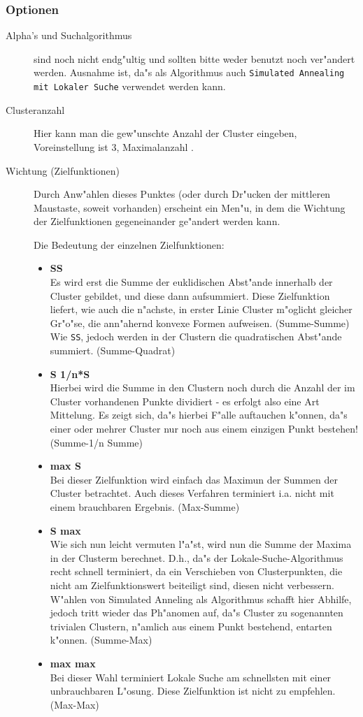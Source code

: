 \subsubsection{Optionen}
\label{Zielfunktionenkapitel}
\begin{description}
\item[Alpha's und Suchalgorithmus] sind noch nicht endg"ultig und sollten
	bitte weder benutzt noch ver"andert werden. Ausnahme ist, da"s als
	Algorithmus auch \verb-Simulated Annealing mit Lokaler Suche-
	verwendet werden kann.
\item[Clusteranzahl] Hier kann man die gew"unschte Anzahl der Cluster
	eingeben, Voreinstellung ist 3, Maximalanzahl \MAXCLUSTER.
\item[Wichtung (Zielfunktionen)] Durch Anw"ahlen dieses Punktes (oder
	durch Dr"ucken der mittleren Maustaste, soweit vorhanden) erscheint
	ein Men"u, in dem die Wichtung der Zielfunktionen gegeneinander
	ge"andert werden kann.

	Die Bedeutung der einzelnen Zielfunktionen:
	\begin{itemize}
	\item {\bf SS}\\
		Es wird erst die Summe der euklidischen Abst"ande innerhalb
		der Cluster gebildet, und diese dann aufsummiert.
		Diese Zielfunktion liefert, wie auch die n"achste, in erster
		Linie Cluster m"oglicht gleicher Gr"o"se, die ann"ahernd
		konvexe Formen aufweisen. (Summe-Summe)
	\\
		Wie \verb-SS-, jedoch werden in der Clustern die 
		quadratischen Abst"ande summiert. (Summe-Quadrat)
	\item {\bf S 1/n*S}\\
		Hierbei wird die Summe in den Clustern noch durch die Anzahl
		der im Cluster vorhandenen Punkte dividiert - es erfolgt
		also eine Art Mittelung. Es zeigt sich, da"s hierbei
		F"alle auftauchen k"onnen, da"s einer oder mehrer Cluster
		nur noch aus einem einzigen Punkt bestehen!
		(Summe-1/n Summe)
	\item {\bf max S}\\
		Bei dieser Zielfunktion wird einfach das Maximun der Summen
		der Cluster betrachtet.  Auch dieses Verfahren terminiert
		i.a. nicht mit einem brauchbaren Ergebnis. (Max-Summe)
	\item {\bf S max}\\
		Wie sich nun leicht vermuten l"a"st, wird nun die Summe
		der Maxima in der Clusterm berechnet. D.h., da"s der
		Lokale-Suche-Algorithmus recht schnell terminiert, da ein
		Verschieben von Clusterpunkten, die nicht am 
		Zielfunktionswert beiteiligt sind, diesen nicht verbessern.
		W"ahlen von Simulated Anneling als Algorithmus schafft
		hier Abhilfe, jedoch tritt wieder das Ph"anomen auf, da"s 
		Cluster zu sogenannten trivialen Clustern, n"amlich aus
		einem Punkt bestehend, entarten k"onnen.
		(Summe-Max)
	\item {\bf max max}\\
		Bei dieser Wahl terminiert Lokale Suche am schnellsten mit
		einer unbrauchbaren L"osung. Diese Zielfunktion ist 
		nicht zu empfehlen. (Max-Max)
	\end{itemize}


\end{description}
